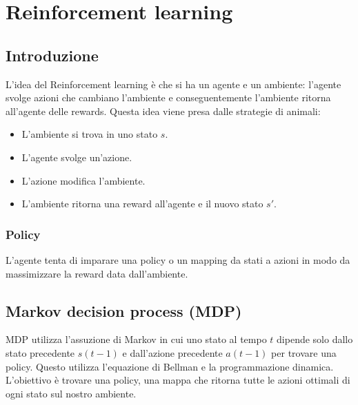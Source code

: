 \chapter{Reinforcement learning}

\section{Introduzione}
L'idea del Reinforcement learning \`e che si ha un agente e un ambiente: l'agente svolge azioni che cambiano l'ambiente e conseguentemente l'ambiente ritorna all'agente delle rewards.
Questa idea viene presa dalle strategie di animali:
\begin{itemize}
	\item L'ambiente si trova in uno stato $s$.
	\item L'agente svolge un'azione.
	\item L'azione modifica l'ambiente.
	\item L'ambiente ritorna una reward all'agente e il nuovo stato $s'$.
\end{itemize}

\subsection{Policy}
L'agente tenta di imparare una policy o un mapping da stati a azioni in modo da massimizzare la reward data dall'ambiente.

\section{Markov decision process (MDP)}
MDP utilizza l'assuzione di Markov in cui uno stato al tempo $t$ dipende solo dallo stato precedente $s(t-1)$ e dall'azione precedente $a(t-1)$ per trovare una policy.
Questo utilizza l'equazione di Bellman e la programmazione dinamica.
L'obiettivo \`e trovare una policy, una mappa che ritorna tutte le azioni ottimali di ogni stato sul nostro ambiente.

